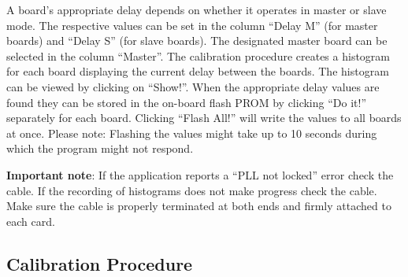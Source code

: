 	A board's appropriate delay depends on whether it operates in master or slave mode. The respective values can be set in the column ``Delay M'' (for master boards) and ``Delay S'' (for slave boards). The designated master board can be selected in the column ``Master''. The calibration procedure creates a histogram for each board displaying the current delay between the boards. The histogram can be viewed by clicking on ``Show!''. When the appropriate delay values are found they can be stored in the on-board flash PROM by clicking ``Do it!'' separately for each board. Clicking ``Flash All!'' will write the values to all boards at once. Please note: Flashing the values might take up to 10 seconds during which the program might not respond.\par

\textbf{Important note}: If the application reports a ``PLL not locked'' error check the cable. If the recording of histograms does not make progress check the cable. Make sure the cable is properly terminated at both ends and firmly attached to each card.

	\subsection{Calibration Procedure}
	
